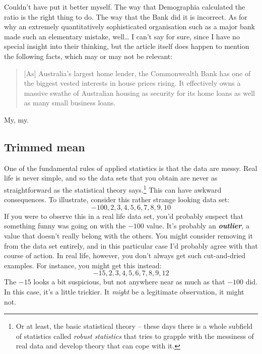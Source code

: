 \documentclass[
]{book}
\begin{document}
Couldn't have put it better myself. The way that Demographia calculated the ratio is the right thing to do. The way that the Bank did it is incorrect. As for why an extremely quantitatively sophisticated organisation such as a major bank made such an elementary mistake, well\ldots{} I can't say for sure, since I have no special insight into their thinking, but the article itself does happen to mention the following facts, which may or may not be relevant:

\begin{quote}
{[}As{]} Australia's largest home lender, the Commonwealth Bank has one of the biggest vested interests in house prices rising. It effectively owns a massive swathe of Australian housing as security for its home loans as well as many small business loans.
\end{quote}

My, my.

\hypertarget{trimmedmean}{%
\subsection{Trimmed mean}\label{trimmedmean}}

One of the fundamental rules of applied statistics is that the data are messy. Real life is never simple, and so the data sets that you obtain are never as straightforward as the statistical theory says.\footnote{Or at least, the basic statistical theory -- these days there is a whole subfield of statistics called \emph{robust statistics} that tries to grapple with the messiness of real data and develop theory that can cope with it.} This can have awkward consequences. To illustrate, consider this rather strange looking data set:
\[
-100,2,3,4,5,6,7,8,9,10
\]
If you were to observe this in a real life data set, you'd probably suspect that something funny was going on with the \(-100\) value. It's probably an \textbf{\emph{outlier}}, a value that doesn't really belong with the others. You might consider removing it from the data set entirely, and in this particular case I'd probably agree with that course of action. In real life, however, you don't always get such cut-and-dried examples. For instance, you might get this instead:
\[
-15,2,3,4,5,6,7,8,9,12
\]
The \(-15\) looks a bit suspicious, but not anywhere near as much as that \(-100\) did. In this case, it's a little trickier. It \emph{might} be a legitimate observation, it might not.
\end{document}
